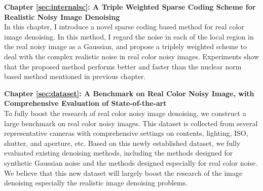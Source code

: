 \textbf{Chapter \ref{sec:internalsc}: A Triple Weighted Sparse Coding Scheme for Realistic Noisy Image Denoising} \\[0.2em]

In this chapter, I introduce a novel sparse coding based method for real color image denoising. In this method, I regard the noise in each of the local region in the real noisy image as a Gaussian, and propose a triplely weighted scheme to deal with the complex realistic noise in real color noisy images. Experiments show that the proposed method performs better and faster than the nuclear norm based method mentioned in previous chapter.


\textbf{Chapter \ref{sec:dataset}: A Benchmark on Real Color Noisy Image, with Comprehensive Evaluation of State-of-the-art} \\[0.2em]

To fully boost the research of real color noisy image denoising, we construct a large benchmark on real color noisy images. This dataset is collected from several representative cameras with comprehensive settings on contents, lighting, ISO, shutter, and aperture, etc. Based on this newly established dataset, we fully evaluated existing denoising methods, including the methods designed for synthetic Gaussian noise and the methods designed especially for real color noise. We believe that this new dataset will largely boost the research of the image denoising especially the realistic image denoising problems.
















